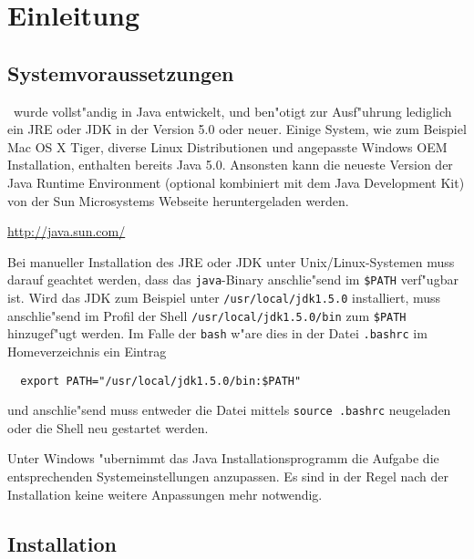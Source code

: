 
\chapter{Einleitung}



\section{Systemvoraussetzungen}

\TPML\ wurde vollst"andig in Java entwickelt, und ben"otigt zur Ausf"uhrung lediglich ein JRE oder
JDK in der Version 5.0 oder neuer.
Einige System, wie zum Beispiel Mac OS X Tiger, diverse Linux Distributionen und angepasste Windows
OEM Installation, enthalten bereits Java 5.0. Ansonsten kann die neueste Version der Java Runtime
Environment (optional kombiniert mit dem Java Development Kit) von der Sun Microsystems Webseite
heruntergeladen werden.

\url{http://java.sun.com/}

Bei manueller Installation des JRE oder JDK unter Unix/Linux-Systemen muss darauf geachtet werden, dass
das {\tt java}-Binary anschlie"send im {\tt \$PATH} verf"ugbar ist. Wird das JDK zum Beispiel unter
{\tt /usr/local/jdk1.5.0} installiert, muss anschlie"send im Profil der Shell {\tt /usr/local/jdk1.5.0/bin}
zum {\tt \$PATH} hinzugef"ugt werden. Im Falle der {\tt bash} w"are dies in der Datei {\tt .bashrc}
im Homeverzeichnis ein Eintrag
\begin{verbatim}
  export PATH="/usr/local/jdk1.5.0/bin:$PATH"
\end{verbatim}
und anschlie"send muss entweder die Datei mittels {\tt source .bashrc} neugeladen oder die
Shell neu gestartet werden.

Unter Windows "ubernimmt das Java Installationsprogramm die Aufgabe die entsprechenden Systemeinstellungen
anzupassen. Es sind in der Regel nach der Installation keine weitere Anpassungen mehr notwendig.



\section{Installation}

